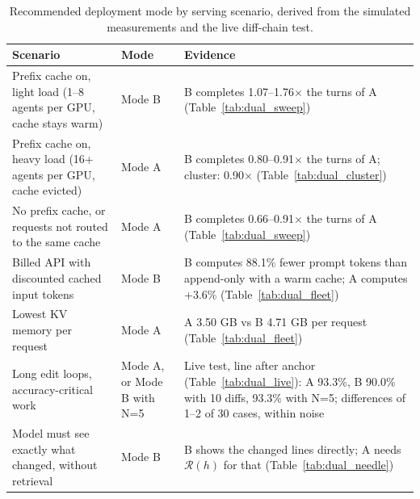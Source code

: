\begin{table}[htbp]\centering\small{}
\caption{Mechanical needle test: what each prompt contains (300 cases). The grader is a program, so it does not measure whether a live model can apply diff chains.}
\label{tab:dual_needle}\end{table}
\begin{table}[t]\centering\small
\begin{tabular}{@{}p{5.2cm}p{2.5cm}p{8.7cm}@{}}\toprule
\textbf{Scenario} & \textbf{Mode} & \textbf{Evidence} \\ \midrule
Prefix cache on, light load (1--8 agents per GPU, cache stays warm) & Mode B & B completes 1.07--1.76$\times$ the turns of A (Table~\ref{tab:dual_sweep}) \\
Prefix cache on, heavy load (16+ agents per GPU, cache evicted) & Mode A & B completes 0.80--0.91$\times$ the turns of A; cluster: 0.90$\times$ (Table~\ref{tab:dual_cluster}) \\
No prefix cache, or requests not routed to the same cache & Mode A & B completes 0.66--0.91$\times$ the turns of A (Table~\ref{tab:dual_sweep}) \\
Billed API with discounted cached input tokens & Mode B & B computes 88.1\% fewer prompt tokens than append-only with a warm cache; A computes +3.6\% (Table~\ref{tab:dual_fleet}) \\
Lowest KV memory per request & Mode A & A 3.50 GB vs B 4.71 GB per request (Table~\ref{tab:dual_fleet}) \\
Long edit loops, accuracy-critical work & Mode A, or Mode B with N=5 & Live test, line after anchor (Table~\ref{tab:dual_live}): A 93.3\%, B 90.0\% with 10 diffs, 93.3\% with N=5; differences of 1--2 of 30 cases, within noise \\
Model must see exactly what changed, without retrieval & Mode B & B shows the changed lines directly; A needs $\mathcal{R}(h)$ for that (Table~\ref{tab:dual_needle}) \\
\bottomrule\end{tabular}
\caption{Recommended deployment mode by serving scenario, derived from the simulated measurements and the live diff-chain test.}
\label{tab:dual_scenarios}\end{table}
